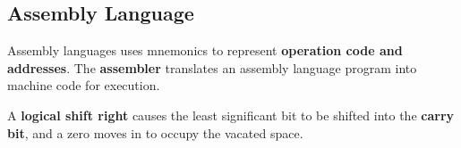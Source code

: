 \subsection{Assembly Language}

Assembly languages uses mnemonics to represent \textbf{operation code and addresses}. The \textbf{assembler} translates an assembly language program into machine code for execution.

A \textbf{logical shift right} causes the least significant bit to be shifted into the \textbf{carry bit}, and a zero moves in to occupy the vacated space.
